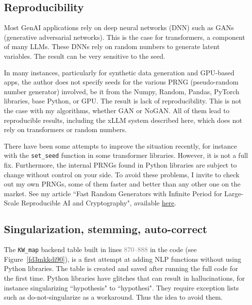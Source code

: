 \documentclass[10pt]{article}
\begin{document}
\subsection{Reproducibility} 

Most GenAI applications rely on deep neural networks (DNN) such as 
\textcolor{index}{GANs} (generative adversarial networks). This is the case for 
\textcolor{index}{transformers}, a component of many LLMs.  
These DNNs rely on random numbers to generate latent variables. The result can be very sensitive to the 
\textcolor{index}{seed}. 

In many instances, particularly for synthetic data generation and GPU-based apps, the author
 does not specify seeds for the various 
\textcolor{index}{PRNG} (pseudo-random number generator) involved, be it from the  Numpy, Random, Pandas, PyTorch libraries, base Python, or GPU.
The result is lack of \textcolor{index}{reproducibility}. This is not the case with my algorithms, whether GAN or
\textcolor{index}{NoGAN}. All of them lead to reproducible results, including the xLLM system
 described here, which does not rely on transformers or random numbers.

There have been some attempts to improve the situation recently, for instance with the \texttt{set\_seed} function in some
 transformer libraries. However, it is not a full fix. Furthermore, the internal PRNGs found in Python libraries are subject to change
 without control on your side. To avoid these problems, I invite to check out my own PRNGs, some of them faster and better
 than any other one on the market. See my article ``Fast Random Generators with Infinite Period for Large-Scale Reproducible AI and Cryptography", available \href{https://mltblog.com/4fGDLu0}{here}. 


\subsection{Singularization, stemming, auto-correct}

The \texttt{KW\_map} backend table built in lines \textcolor{gray}{870--888} in the code (see Figure~\ref{fd3mkkdi90}),
 is a first attempt at adding \textcolor{index}{NLP} functions without using Python libraries. The table is created and saved after running the full code for the first time. Python libraries have glitches that can result in hallucinations, for 
 instance singularizing ``hypothesis" to ``hypothesi". They require exception lists such as do-not-singularize as a workaround.
Thus the idea to avoid them.  
\end{document}
